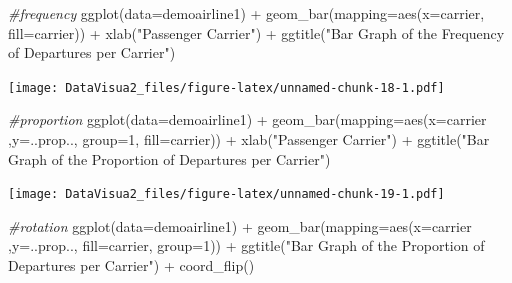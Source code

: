 \documentclass[
]{article}
\newenvironment{Shaded}{\begin{snugshade}}{\end{snugshade}}
\newcommand{\AttributeTok}[1]{\textcolor[rgb]{0.77,0.63,0.00}{#1}}
\newcommand{\CommentTok}[1]{\textcolor[rgb]{0.56,0.35,0.01}{\textit{#1}}}
\newcommand{\DecValTok}[1]{\textcolor[rgb]{0.00,0.00,0.81}{#1}}
\newcommand{\FunctionTok}[1]{\textcolor[rgb]{0.00,0.00,0.00}{#1}}
\newcommand{\NormalTok}[1]{#1}
\newcommand{\SpecialCharTok}[1]{\textcolor[rgb]{0.00,0.00,0.00}{#1}}
\newcommand{\StringTok}[1]{\textcolor[rgb]{0.31,0.60,0.02}{#1}}
\begin{document}
\begin{Shaded}
\begin{Highlighting}[]
\CommentTok{\#frequency}
\FunctionTok{ggplot}\NormalTok{(}\AttributeTok{data=}\NormalTok{demoairline1) }\SpecialCharTok{+} \FunctionTok{geom\_bar}\NormalTok{(}\AttributeTok{mapping=}\FunctionTok{aes}\NormalTok{(}\AttributeTok{x=}\NormalTok{carrier, }\AttributeTok{fill=}\NormalTok{carrier)) }\SpecialCharTok{+} \FunctionTok{xlab}\NormalTok{(}\StringTok{"Passenger Carrier"}\NormalTok{) }\SpecialCharTok{+} \FunctionTok{ggtitle}\NormalTok{(}\StringTok{"Bar Graph of the Frequency of Departures per Carrier"}\NormalTok{)}
\end{Highlighting}
\end{Shaded}

\texttt{[image: DataVisua2\_files/figure-latex/unnamed-chunk-18-1.pdf]}

\begin{Shaded}
\begin{Highlighting}[]
\CommentTok{\#proportion}
\FunctionTok{ggplot}\NormalTok{(}\AttributeTok{data=}\NormalTok{demoairline1) }\SpecialCharTok{+} \FunctionTok{geom\_bar}\NormalTok{(}\AttributeTok{mapping=}\FunctionTok{aes}\NormalTok{(}\AttributeTok{x=}\NormalTok{carrier ,}\AttributeTok{y=}\NormalTok{..prop.., }\AttributeTok{group=}\DecValTok{1}\NormalTok{, }\AttributeTok{fill=}\NormalTok{carrier)) }\SpecialCharTok{+} \FunctionTok{xlab}\NormalTok{(}\StringTok{"Passenger Carrier"}\NormalTok{) }\SpecialCharTok{+} \FunctionTok{ggtitle}\NormalTok{(}\StringTok{"Bar Graph of the Proportion of Departures per Carrier"}\NormalTok{)}
\end{Highlighting}
\end{Shaded}

\texttt{[image: DataVisua2\_files/figure-latex/unnamed-chunk-19-1.pdf]}

\begin{Shaded}
\begin{Highlighting}[]
\CommentTok{\#rotation}
\FunctionTok{ggplot}\NormalTok{(}\AttributeTok{data=}\NormalTok{demoairline1) }\SpecialCharTok{+} \FunctionTok{geom\_bar}\NormalTok{(}\AttributeTok{mapping=}\FunctionTok{aes}\NormalTok{(}\AttributeTok{x=}\NormalTok{carrier ,}\AttributeTok{y=}\NormalTok{..prop.., }\AttributeTok{fill=}\NormalTok{carrier, }\AttributeTok{group=}\DecValTok{1}\NormalTok{)) }\SpecialCharTok{+} \FunctionTok{ggtitle}\NormalTok{(}\StringTok{"Bar Graph of the Proportion of Departures per Carrier"}\NormalTok{) }\SpecialCharTok{+} \FunctionTok{coord\_flip}\NormalTok{()}
\end{Highlighting}
\end{Shaded}
\end{document}
